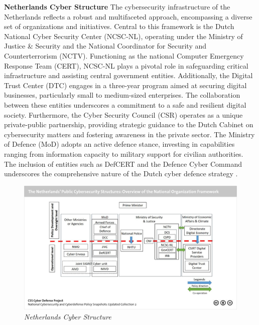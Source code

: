 \textbf{Netherlands Cyber Structure} The cybersecurity infrastructure of the Netherlands reflects a robust and multifaceted approach, encompassing a diverse set of organizations and initiatives. Central to this framework is the Dutch National Cyber Security Center (NCSC-NL), operating under the Ministry of Justice & Security and the National Coordinator for Security and Counterterrorism (NCTV). Functioning as the national Computer Emergency Response Team (CERT), NCSC-NL plays a pivotal role in safeguarding critical infrastructure and assisting central government entities. Additionally, the Digital Trust Center (DTC) engages in a three-year program aimed at securing digital businesses, particularly small to medium-sized enterprises. The collaboration between these entities underscores a commitment to a safe and resilient digital society. Furthermore, the Cyber Security Council (CSR) operates as a unique private-public partnership, providing strategic guidance to the Dutch Cabinet on cybersecurity matters and fostering awareness in the private sector. The Ministry of Defence (MoD) adopts an active defence stance, investing in capabilities ranging from information capacity to military support for civilian authorities. The inclusion of entities such as DefCERT and the Defence Cyber Command underscores the comprehensive nature of the Dutch cyber defence strategy \autocite{sdewar_2018_national, theinternationalinstituteforstrategicstudies_2023_cyber}.

\begin{figure}[H]
    \centering
    \includegraphics[width=1\textwidth]{Images/netherlands.jpg}
    \caption{\textit{Netherlands Cyber Structure}}
    \label{fig:netherlands}
\end{figure}

